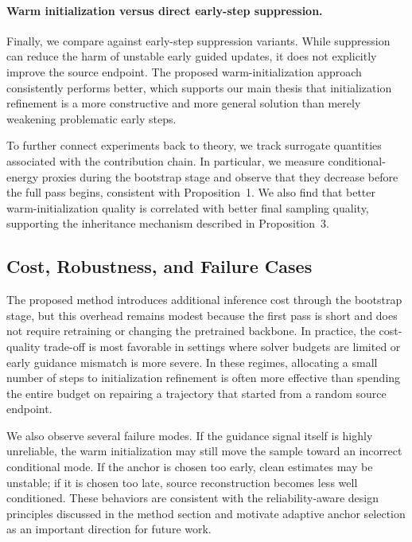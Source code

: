 \documentclass[letterpaper]{article} %
\begin{document}
\paragraph{Warm initialization versus direct early-step suppression.}
Finally, we compare against early-step suppression variants. While suppression can reduce the harm of unstable early guided updates, it does not explicitly improve the source endpoint. The proposed warm-initialization approach consistently performs better, which supports our main thesis that initialization refinement is a more constructive and more general solution than merely weakening problematic early steps.

To further connect experiments back to theory, we track surrogate quantities associated with the contribution chain. In particular, we measure conditional-energy proxies during the bootstrap stage and observe that they decrease before the full pass begins, consistent with Proposition~1. We also find that better warm-initialization quality is correlated with better final sampling quality, supporting the inheritance mechanism described in Proposition~3.

\subsection{Cost, Robustness, and Failure Cases}

The proposed method introduces additional inference cost through the bootstrap stage, but this overhead remains modest because the first pass is short and does not require retraining or changing the pretrained backbone. In practice, the cost-quality trade-off is most favorable in settings where solver budgets are limited or early guidance mismatch is more severe. In these regimes, allocating a small number of steps to initialization refinement is often more effective than spending the entire budget on repairing a trajectory that started from a random source endpoint.

We also observe several failure modes. If the guidance signal itself is highly unreliable, the warm initialization may still move the sample toward an incorrect conditional mode. If the anchor is chosen too early, clean estimates may be unstable; if it is chosen too late, source reconstruction becomes less well conditioned. These behaviors are consistent with the reliability-aware design principles discussed in the method section and motivate adaptive anchor selection as an important direction for future work.
\end{document}

